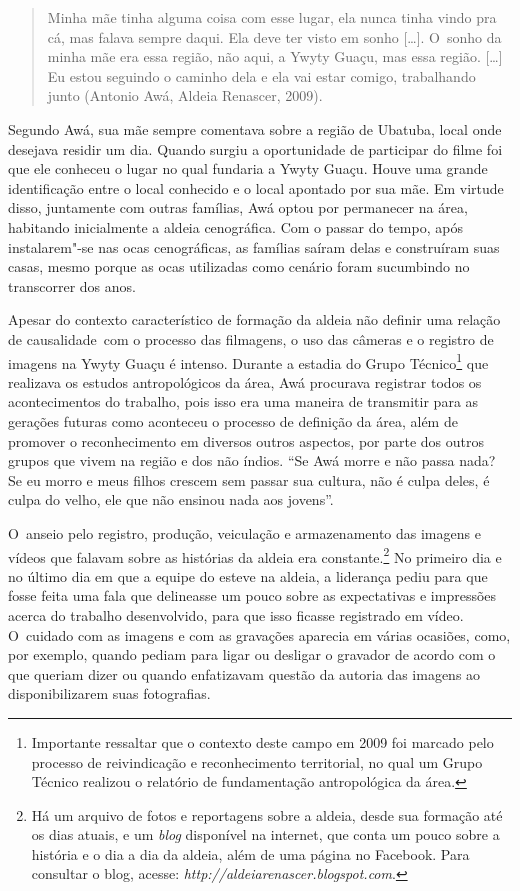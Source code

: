 \begin{quote}
\noindent
Minha mãe tinha alguma coisa com esse lugar, ela nunca tinha vindo pra
cá, mas falava sempre daqui. Ela deve ter visto em sonho [\ldots{}]. O~sonho
da minha mãe era essa região, não aqui, a Ywyty Guaçu, mas essa região.
[\ldots{}] Eu estou seguindo o caminho dela e ela vai estar comigo,
trabalhando junto (Antonio Awá, Aldeia Renascer, 2009).
\end{quote}

Segundo Awá, sua mãe sempre comentava sobre a região de Ubatuba, local
onde desejava residir um dia. Quando surgiu a oportunidade de
participar do filme foi que ele conheceu o lugar no qual fundaria a
Ywyty Guaçu. Houve uma grande identificação entre o local conhecido e o
local apontado por sua mãe. Em virtude disso, juntamente com outras
famílias, Awá optou por permanecer na área, habitando inicialmente a
aldeia cenográfica. Com o passar do tempo, após instalarem"-se nas ocas
cenográficas, as famílias saíram delas e construíram suas casas, mesmo
porque as ocas utilizadas como cenário foram sucumbindo no transcorrer
dos anos. 

Apesar do contexto característico de formação da aldeia não definir uma
relação de causalidade~com o processo das filmagens, o uso das câmeras
e o registro de imagens na Ywyty Guaçu é intenso. Durante a estadia do
Grupo Técnico\footnote{Importante ressaltar que o contexto deste campo
em 2009 foi marcado pelo processo de reivindicação e reconhecimento
territorial, no qual um Grupo Técnico realizou o relatório de
fundamentação antropológica da área.} que realizava os estudos
antropológicos da área, Awá procurava registrar todos os acontecimentos
do trabalho, pois isso era uma maneira de transmitir para as gerações
futuras como aconteceu o processo de definição da área, além de
promover o reconhecimento em diversos outros aspectos, por parte dos
outros grupos que vivem na região e dos não índios. ``Se Awá morre e não
passa nada? Se eu morro e meus filhos crescem sem passar sua cultura,
não é culpa deles, é culpa do velho, ele que não ensinou nada aos
jovens''. 

O~anseio pelo registro, produção, veiculação e armazenamento das imagens
e vídeos que falavam sobre as histórias da aldeia era
constante.\footnote{Há um arquivo de fotos e reportagens sobre a
aldeia, desde sua formação até os dias atuais, e um \emph{blog} disponível na
internet, que conta um pouco sobre a história e o dia a dia da aldeia,
além de uma página no Facebook. Para consultar o blog, acesse:
\emph{http://aldeiarenascer.blogspot.com}.} No
primeiro dia e no último dia em que a equipe do  esteve na aldeia, a
liderança pediu para que fosse feita uma fala que delineasse um pouco
sobre as expectativas e impressões acerca do trabalho desenvolvido,
para que isso ficasse registrado em vídeo. O~cuidado com as imagens e
com as gravações aparecia em várias ocasiões, como, por exemplo, quando
pediam para ligar ou desligar o gravador de acordo com o que queriam
dizer ou quando enfatizavam questão da autoria das imagens ao
disponibilizarem suas fotografias.

